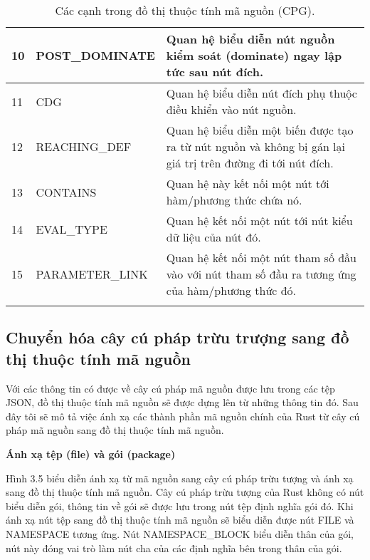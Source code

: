 \begin{longtable}{| p{} | p{} | p{} |}
10 & POST\_DOMINATE  & Quan hệ biểu diễn nút nguồn kiểm soát (dominate) ngay lập tức sau nút đích.                                                                                                                                  \\ \hline
11 & CDG            & Quan hệ biểu diễn nút đích phụ thuộc điều khiển vào nút nguồn.                                                                                                                                               \\ \hline
12 & REACHING\_DEF   & Quan hệ biểu diễn một biến được tạo ra từ nút nguồn và không bị gán lại giá trị trên đường đi tới nút đích.                                                                                                  \\ \hline
13 & CONTAINS       & Quan hệ này kết nối một nút tới hàm/phương thức chứa nó.                                                                                                                                                     \\ \hline
14 & EVAL\_TYPE      & Quan hệ kết nối một nút tới nút kiểu dữ liệu của nút đó.                                                                                                                                                     \\ \hline
15 & PARAMETER\_LINK & Quan hệ kết nối một nút tham số đầu vào với nút tham số đầu ra tương ứng của hàm/phương thức đó.                                                                                                             \\ \hline
\caption{Các cạnh trong đồ thị thuộc tính mã nguồn (CPG).}
\label{table:c3_edgecpgjoern}
\end{longtable}
\medskip

\subsection{Chuyển hóa cây cú pháp trừu trượng sang đồ thị thuộc tính mã nguồn}

Với các thông tin có được về cây cú pháp mã nguồn được lưu trong các tệp JSON,
đồ thị thuộc tính mã nguồn sẽ được dựng lên từ những thông tin đó.
Sau đây tôi sẽ mô tả việc ánh xạ các thành phần mã nguồn chính của Rust từ cây cú pháp mã nguồn sang đồ thị thuộc tính mã nguồn.

\textbf{Ánh xạ tệp (file) và gói (package)}

Hình 3.5 biểu diễn ánh xạ từ mã nguồn sang cây cú pháp trừu tượng và ánh xạ sang đồ thị thuộc tính mã nguồn.
Cây cú pháp trừu tượng của Rust không có nút biểu diễn gói, thông tin về gói sẽ được lưu trong nút tệp định nghĩa gói đó.
Khi ánh xạ nút tệp sang đồ thị thuộc tính mã nguồn sẽ biểu diễn được nút FILE và NAMESPACE tương ứng.
Nút NAMESPACE\_BLOCK biểu diễn thân của gói, nút này đóng vai trò làm nút cha của các định nghĩa bên trong thân của gói.
